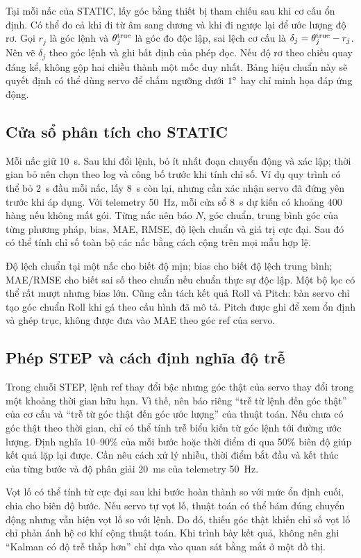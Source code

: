 Tại mỗi nấc của STATIC, lấy góc bằng thiết bị tham chiếu sau khi cơ cấu ổn định. Có thể đo cả khi đi từ âm sang dương và khi đi ngược lại để ước lượng độ rơ. Gọi $r_j$ là góc lệnh và $\theta_j^{\rm true}$ là góc đo độc lập, sai lệch cơ cấu là $\delta_j=\theta_j^{\rm true}-r_j$. Nên vẽ $\delta_j$ theo góc lệnh và ghi bất định của phép đọc. Nếu độ rơ theo chiều quay đáng kể, không gộp hai chiều thành một mốc duy nhất. Bảng hiệu chuẩn này sẽ quyết định có thể dùng servo để chấm ngưỡng dưới $1^{\circ}$ hay chỉ minh họa đáp ứng động.

\subsection{Cửa sổ phân tích cho STATIC}
Mỗi nấc giữ 10~s. Sau khi đổi lệnh, bỏ ít nhất đoạn chuyển động và xác lập; thời gian bỏ nên chọn theo log và công bố trước khi tính chỉ số. Ví dụ quy trình có thể bỏ 2~s đầu mỗi nấc, lấy 8~s còn lại, nhưng cần xác nhận servo đã đứng yên trước khi áp dụng. Với telemetry 50~Hz, mỗi cửa sổ 8~s dự kiến có khoảng 400 hàng nếu không mất gói. Từng nấc nên báo $N$, góc chuẩn, trung bình góc của từng phương pháp, bias, MAE, RMSE, độ lệch chuẩn và giá trị cực đại. Sau đó có thể tính chỉ số toàn bộ các nấc bằng cách cộng trên mọi mẫu hợp lệ.

Độ lệch chuẩn tại một nấc cho biết độ mịn; bias cho biết độ lệch trung bình; MAE/RMSE cho biết sai số theo chuẩn nếu chuẩn thực sự độc lập. Một bộ lọc có thể rất mượt nhưng bias lớn. Cũng cần tách kết quả Roll và Pitch: bàn servo chỉ tạo góc chuẩn Roll khi gá theo cấu hình đã mô tả. Pitch được ghi để xem ổn định và ghép trục, không được đưa vào MAE theo góc ref của servo.

\subsection{Phép STEP và cách định nghĩa độ trễ}
Trong chuỗi STEP, lệnh ref thay đổi bậc nhưng góc thật của servo thay đổi trong một khoảng thời gian hữu hạn. Vì thế, nên báo riêng ``trễ từ lệnh đến góc thật'' của cơ cấu và ``trễ từ góc thật đến góc ước lượng'' của thuật toán. Nếu chưa có góc thật theo thời gian, chỉ có thể tính trễ biểu kiến từ góc lệnh tới đường ước lượng. Định nghĩa 10--90\% của mỗi bước hoặc thời điểm đi qua 50\% biên độ giúp kết quả lặp lại được. Cần nêu cách xử lý nhiễu, thời điểm bắt đầu và kết thúc của từng bước và độ phân giải 20~ms của telemetry 50~Hz.

Vọt lố có thể tính từ cực đại sau khi bước hoàn thành so với mức ổn định cuối, chia cho biên độ bước. Nếu servo tự vọt lố, thuật toán có thể bám đúng chuyển động nhưng vẫn hiện vọt lố so với lệnh. Do đó, thiếu góc thật khiến chỉ số vọt lố chỉ phản ánh hệ cơ khí cộng thuật toán. Khi trình bày kết quả, không nên ghi ``Kalman có độ trễ thấp hơn'' chỉ dựa vào quan sát bằng mắt ở một đồ thị.

